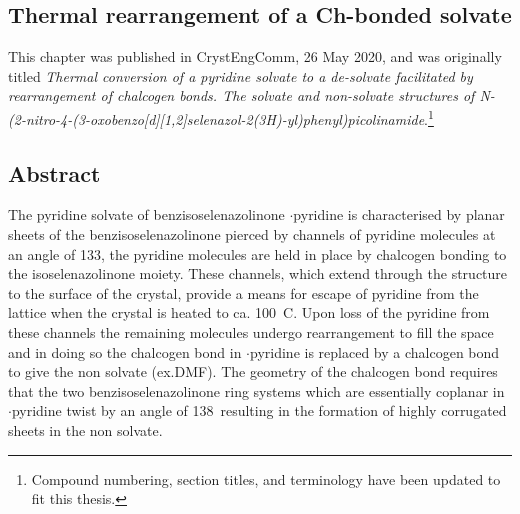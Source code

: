 \begin{refsection}

    
    \chapter{Thermal rearrangement of a Ch-bonded solvate}\label{ch:thermal-conversion}
    
    This chapter was published in CrystEngComm, 26 May 2020, and was originally titled \emph{Thermal conversion of a pyridine solvate to a de-solvate facilitated by rearrangement of chalcogen bonds. The solvate and non-solvate structures of N-(2-nitro-4-(3-oxobenzo[\emph{d}][1,2]selenazol-2(3\emph{H})-yl)phenyl)picolinamide}\autocite{Fellowes2020a}.\footnote{Compound numbering, section titles, and terminology have been updated to fit this thesis.}
    
    \section{Abstract}
    The pyridine solvate of benzisoselenazolinone $\cdot$pyridine is characterised by planar sheets of the benzisoselenazolinone  pierced by channels of pyridine molecules at an angle of 133\degree, the pyridine molecules are held in place by  chalcogen bonding to the isoselenazolinone moiety.
    These channels, which extend through the structure to the surface of the crystal, provide a means for escape of pyridine from the lattice when the crystal is heated to ca. 100~\degree{}C.
    Upon loss of the pyridine from these channels the remaining molecules undergo rearrangement to fill the space and in doing so the  chalcogen bond in $\cdot$pyridine is replaced by a  chalcogen bond to give the non solvate (ex.DMF).
    The geometry of the chalcogen bond requires that the two benzisoselenazolinone ring systems which are essentially coplanar in $\cdot$pyridine twist by an angle of 138\degree~resulting in the formation of highly corrugated sheets in the non solvate.
    

\end{refsection}
